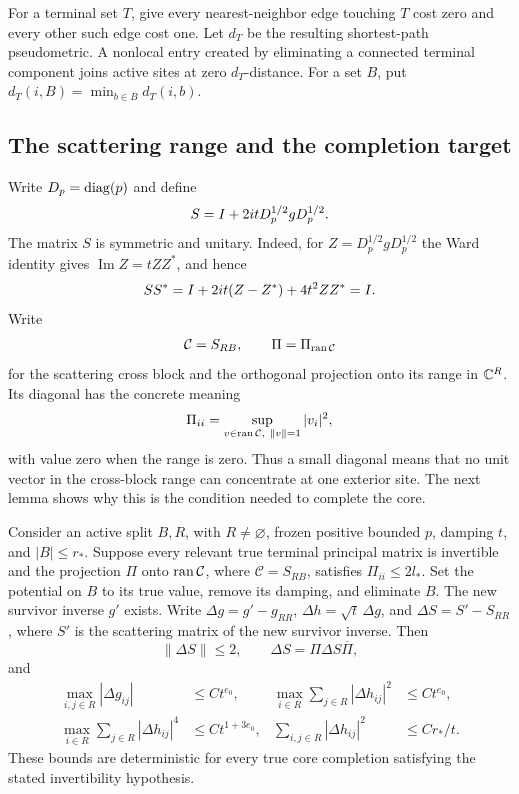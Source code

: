 For a terminal set $T$, give every nearest-neighbor edge touching $T$ cost
zero and every other such edge cost one. Let $d_T$ be the resulting
shortest-path pseudometric. A nonlocal entry created by eliminating a
connected terminal component joins active sites at zero $d_T$-distance.
For a set $B$, put $d_T(i,B)=\min_{b\in B}d_T(i,b)$.

\subsection{The scattering range and the completion target}

Write $D_p=\operatorname{diag}(p)$ and define
\begin{equation}\label{eq:clearing-scattering}
 S=I+2itD_p^{1/2}gD_p^{1/2}.
\end{equation}
The matrix $S$ is symmetric and unitary. Indeed, for
$Z=D_p^{1/2}gD_p^{1/2}$ the Ward identity gives
$\operatorname{Im}Z=tZZ^*$, and hence
\[
 SS^*=I+2it(Z-Z^*)+4t^2ZZ^*=I.
\]
Write
\[
 \mathcal C=S_{RB},\qquad \Pi=\Pi_{\operatorname{ran}\mathcal C}
\]
for the scattering cross block and the orthogonal projection onto its
range in $\mathbb C^R$. Its diagonal has the concrete meaning
\[
 \Pi_{ii}=\sup_{v\in\Ran\mathcal C,\ \|v\|=1}|v_i|^2,
\]
with value zero when the range is zero. Thus a small diagonal means that
no unit vector in the cross-block range can concentrate at one exterior
site. The next lemma shows why this is the condition needed to complete
the core.

\begin{lemma}\label{lem:core-completion}
Consider an active split $B,R$, with $R\ne\varnothing$, frozen positive
bounded $p$, damping $t$, and $|B|\le r_*$. Suppose every relevant true
terminal principal matrix is invertible and the projection $\Pi$ onto
$\operatorname{ran}\mathcal C$, where $\mathcal C=S_{RB}$, satisfies $\Pi_{ii}\le2l_*$.
Set the potential on $B$ to its true value, remove its damping, and
eliminate $B$. The new survivor inverse $g'$ exists. Write
$\Delta g=g'-g_{RR}$, $\Delta h=\sqrt t\,\Delta g$, and
$\Delta S=S'-S_{RR}$, where $S'$ is the scattering matrix of the new
survivor inverse. Then
\[
 \|\Delta S\|\le2,\qquad
 \Delta S=\Pi\Delta S\overline\Pi,
\]
and
\begin{align}
 \max_{i,j\in R}|\Delta g_{ij}|&\le Ct^{e_0},
 &\max_{i\in R}\sum_{j\in R}|\Delta h_{ij}|^2&\le Ct^{e_0},
 \label{eq:assembly-core-rows}\\
 \max_{i\in R}\sum_{j\in R}|\Delta h_{ij}|^4&\le Ct^{1+3e_0},
 &\sum_{i,j\in R}|\Delta h_{ij}|^2&\le Cr_*/t.
 \label{eq:assembly-core-fourth}
\end{align}
These bounds are deterministic for every true core completion satisfying
the stated invertibility hypothesis.
\end{lemma}

